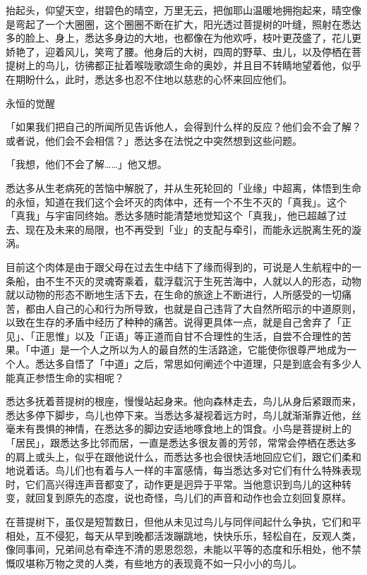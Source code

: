 \documentclass[12pt,twoside,openany]{book}
\begin{document}
抬起头，仰望天空，绀碧色的晴空，万里无云，把伽耶山温暖地拥抱起来，晴空像是弯起了一个大圈圈，这个圈圈不断在扩大，阳光透过菩提树的叶缝，照射在悉达多的脸上、身上，悉达多身边的大地，也都像在为他欢呼，枝叶更茂盛了，花儿更娇艳了，迎着风儿，笑弯了腰。他身后的大树，四周的野草、虫儿，以及停栖在菩提树上的鸟儿，彷彿都正扯着喉咙歌颂生命的奥妙，并且目不转睛地望着他，似乎在期盼什么，此时，悉达多也忍不住地以慈悲的心怀来回应他们。

永恒的觉醒

「如果我们把自己的所闻所见告诉他人，会得到什么样的反应？他们会不会了解？或者说，他们会不会相信？」悉达多在法悦之中突然想到这些问题。

「我想，他们不会了解……」他又想。

悉达多从生老病死的苦恼中解脱了，并从生死轮回的「业缘」中超离，体悟到生命的永恒，知道在我们这个会坏灭的肉体中，还有一个不生不灭的「真我」。这个「真我」与宇宙同终始。悉达多随时能清楚地觉知这个「真我」，他已超越了过去、现在及未来的局限，也不再受到「业」的支配与牵引，而能永远脱离生死的漩涡。

目前这个肉体是由于跟父母在过去生中结下了缘而得到的，可说是人生航程中的一条船，由不生不灭的灵魂寄乘着，载浮载沉于生死苦海中，人就以人的形态，动物就以动物的形态不断地生活下去，在生命的旅途上不断进行，人所感受的一切痛苦，都由人自己的心和行为所导致，也就是自己违背了大自然所昭示的中道原则，以致在生存的矛盾中经历了种种的痛苦。说得更具体一点，就是自己舍弃了「正见」、「正思惟」以及「正语」等正道而自甘不合理性的生活，自尝不合理性的苦果。「中道」是一个人之所以为人的最自然的生活路途，它能使你很尊严地成为一个人。悉达多自悟了「中道」之后，常思如何阐述个中道理，只是到底会有多少人能真正参悟生命的实相呢？

悉达多抚着菩提树的根座，慢慢站起身来。他向森林走去，鸟儿从身后紧跟而来，悉达多停下脚步，鸟儿也停下来。当悉达多凝视着远方时，鸟儿就渐渐靠近他，丝毫未有畏惧的神情，在悉达多的脚边安适地啄食地上的饵食。小鸟是菩提树上的「居民」，跟悉达多比邻而居，一直是悉达多很友善的芳邻，常常会停栖在悉达多的肩上或头上，似乎在跟他说什么，而悉达多也会很快活地回应它们，跟它们柔和地说着话。鸟儿们也有着与人一样的丰富感情，每当悉达多对它们有什么特殊表现时，它们高兴得连声音都变了，动作更是迥异于平常。当他意识到鸟儿的这种转变，就回复到原先的态度，说也奇怪，鸟儿们的声音和动作也会立刻回复原样。

在菩提树下，虽仅是短暂数日，但他从未见过鸟儿与同伴间起什么争执，它们和平相处，互不侵犯，每天从早到晚都活泼蹦跳地，快快乐乐，轻松自在，反观人类，像同事间，兄弟间总有牵连不清的恩恩怨怨，未能以平等的态度和乐相处，他不禁慨叹堪称万物之灵的人类，有些地方的表现竟不如一只小小的鸟儿。
\end{document}
